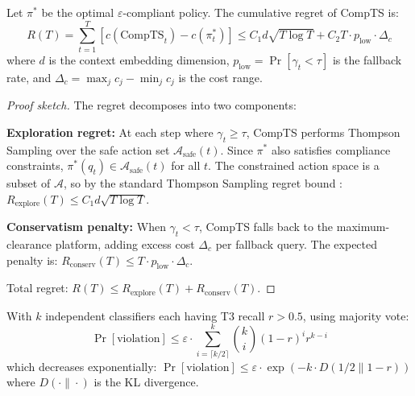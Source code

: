 
\begin{theorem}
\label{thm:regret}
Let $\pi^*$ be the optimal $\varepsilon$-compliant policy. The 
cumulative regret of CompTS is:
\begin{equation}
R(T) = \sum_{t=1}^{T}\left[c(\text{CompTS}_t) - c(\pi^*_t)\right]
\leq C_1 d\sqrt{T\log T} + C_2 T \cdot p_{\text{low}} \cdot \Delta_c
\end{equation}
where $d$ is the context embedding dimension, 
$p_{\text{low}} = \Pr[\gamma_t < \tau]$ is the fallback rate, and 
$\Delta_c = \max_j c_j - \min_j c_j$ is the cost range.
\end{theorem}

\begin{proof}[Proof sketch]
The regret decomposes into two components:

\textbf{Exploration regret:} At each step where $\gamma_t \geq \tau$, 
CompTS performs Thompson Sampling over the safe action set 
$\mathcal{A}_{\text{safe}}(t)$. Since $\pi^*$ also satisfies 
compliance constraints, $\pi^*(q_t) \in \mathcal{A}_{\text{safe}}(t)$ 
for all $t$. The constrained action space is a subset of $\mathcal{A}$, 
so by the standard Thompson Sampling regret bound 
\citep{agrawal2013thompson}: $R_{\text{explore}}(T) \leq C_1 d\sqrt{T\log T}$.

\textbf{Conservatism penalty:} When $\gamma_t < \tau$, CompTS falls 
back to the maximum-clearance platform, adding excess cost 
$\Delta_c$ per fallback query. The expected penalty is:
$R_{\text{conserv}}(T) \leq T \cdot p_{\text{low}} \cdot \Delta_c$.

Total regret: $R(T) \leq R_{\text{explore}}(T) + R_{\text{conserv}}(T)$.
\end{proof}


\begin{theorem}
\label{thm:ensemble}
With $k$ independent classifiers each having T3 recall $r > 0.5$, 
using majority vote:
\begin{equation}
\Pr[\text{violation}] \leq \varepsilon \cdot \sum_{i=\lceil k/2\rceil}^{k}
\binom{k}{i}(1-r)^i r^{k-i}
\end{equation}
which decreases exponentially:
$\Pr[\text{violation}] \leq \varepsilon \cdot \exp(-k \cdot D(1/2 \| 1-r))$
where $D(\cdot\|\cdot)$ is the KL divergence.
\end{theorem}

